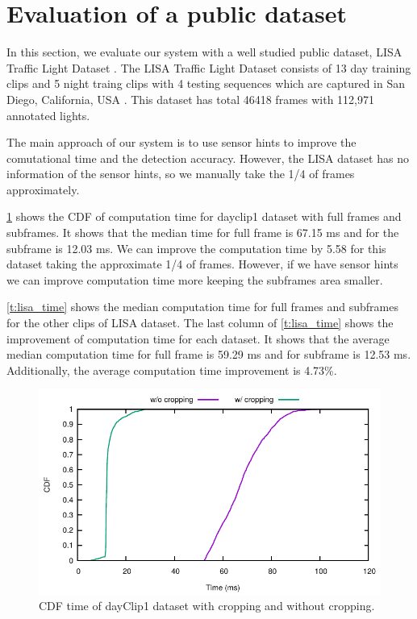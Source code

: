 \section{Evaluation of a public dataset}

In this section, we evaluate our system with a well studied public dataset, LISA Traffic Light Dataset \cite{lisa}.
The LISA Traffic Light Dataset consists of 13 day training clips and 5 night traing clips with 4 testing sequences which are captured in San Diego, California, USA \cite{lisa2}.
This dataset has total 46418 frames with 112,971 annotated lights.

The main approach of our system is to use sensor hints to improve the comutational time and the detection accuracy.
However, the LISA dataset has no information of the sensor hints, so we manually take the 1/4 of frames approximately.

\ref{f:lisa_cdf} shows the CDF of computation time for dayclip1 dataset with full frames and subframes.
It shows that the median time for full frame is 67.15 ms and for the subframe is 12.03 ms.
We can improve the computation time by 5.58 for this dataset taking the approximate 1/4 of frames.
However, if we have sensor hints we can improve computation time more keeping the subframes area smaller.

\ref{t:lisa_time} shows the median computation time for full frames and subframes for the other clips of LISA dataset.
The last column of \ref{t:lisa_time} shows the improvement of computation time for each dataset.
It shows that the average median computation time for full frame is 59.29 ms and for subframe is 12.53 ms.
Additionally, the average computation time improvement is 4.73\%. 


\begin{figure}[ht!]
  \centering
  \includegraphics[width=5.2in]{plots/lisaday1_cdf.pdf}
  \caption{CDF time of dayClip1 dataset with cropping and without cropping.}
  \label{f:lisa_cdf}
\end{figure}


